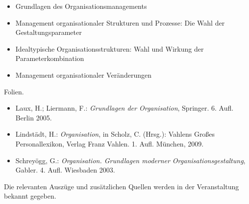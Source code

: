 \begin{course}
\begin{content}
\begin{itemize}\item Grundlagen des Organisationsmanagements  \item Management organisationaler Strukturen und Prozesse: Die Wahl der Gestaltungsparameter  \item Idealtypische Organisationsstrukturen: Wahl und Wirkung der Parameterkombination  \item Management organisationaler Veränderungen  \end{itemize}
\end{content}

\begin{media}Folien.

\end{media}

\begin{literature}\begin{itemize}\item Laux, H.; Liermann, F.: \emph{Grundlagen der Organisation}, Springer. 6. Aufl. Berlin 2005.  \item Lindstädt, H.: \emph{Organisation}, in Scholz, C. (Hrsg.): Vahlens Großes Personallexikon, Verlag Franz Vahlen. 1. Aufl. München, 2009.  \item Schreyögg, G.: \emph{Organisation. Grundlagen moderner Organisationsgestaltung}, Gabler. 4. Aufl. Wiesbaden 2003.  \end{itemize}

Die relevanten Auszüge und zusätzlichen Quellen werden in der Veranstaltung bekannt gegeben.

\end{literature}



\end{course}